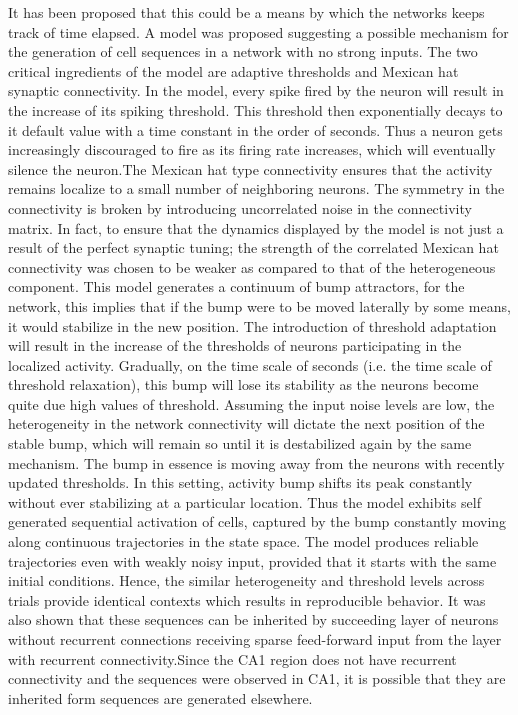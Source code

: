 It has been proposed that this could be a means by which the networks keeps track of time elapsed. A model was proposed suggesting a possible mechanism for the generation of cell sequences in a network with no strong inputs.  The two critical ingredients of the model are adaptive thresholds and Mexican hat synaptic connectivity. In the model, every spike fired by the neuron will result in the increase of its spiking threshold. This threshold then exponentially decays to it default value with a time constant in the order of seconds. Thus a neuron gets increasingly discouraged to fire as its firing rate increases, which will eventually silence the neuron.The Mexican hat type connectivity ensures that the activity remains localize to a small number of neighboring neurons. The symmetry in the connectivity is broken by introducing uncorrelated noise in the connectivity matrix. In fact, to ensure that the dynamics displayed by the model is not just a result of the perfect synaptic tuning; the strength of the correlated Mexican hat connectivity was chosen to be weaker as compared to that of the heterogeneous component. This model generates a continuum of bump attractors, for the network, this implies that if the bump were to be moved laterally by some means, it would stabilize in the new position.  The introduction of threshold adaptation will result in the increase of the thresholds of neurons participating in the localized activity. Gradually, on the time scale of seconds (i.e. the time scale of threshold relaxation), this bump will lose its stability as the neurons become quite due high values of threshold. Assuming the input noise levels are low, the heterogeneity in the network connectivity will dictate the next position of the stable bump, which will remain so until it is destabilized again by the same mechanism. The bump in essence is moving away from the neurons with recently updated thresholds. In this setting, activity bump shifts its peak constantly without ever stabilizing at a particular location. Thus the model exhibits self generated sequential activation of cells, captured by the bump constantly moving along continuous trajectories in the state space. The model produces reliable trajectories even with weakly noisy input, provided that it starts with the same initial conditions. Hence, the similar heterogeneity and threshold levels across trials provide identical contexts which results in reproducible behavior. It was also shown that these sequences can be inherited by succeeding layer of neurons without recurrent connections receiving sparse feed-forward input from the layer with recurrent connectivity.Since the CA1 region does not have recurrent connectivity and the sequences were observed in CA1, it is possible that they are inherited form sequences are generated elsewhere.

